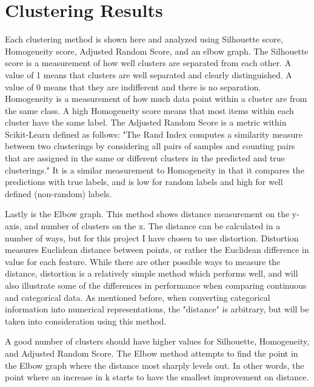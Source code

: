 \documentclass[
	letterpaper, %
]{mlreport}
\begin{document}
\section{Clustering Results}
Each clustering method is shown here and analyzed using Silhouette score, Homogeneity score, Adjusted Random Score, and an elbow graph. The Silhouette score is a measurement of how well clusters are separated from each other. A value of 1 means that clusters are well separated and clearly distinguished. A value of 0 means that they are indifferent and there is no separation. Homogeneity is a measurement of how much data point within a cluster are from the same class. A high Homogeneity score means that most items within each cluster have the same label. The Adjusted Random Score is a metric within Scikit-Learn defined as follows: "The Rand Index computes a similarity measure between two clusterings by considering all pairs of samples and counting pairs that are assigned in the same or different clusters in the predicted and true clusterings." It is a similar measurement to Homogeneity in that it compares the predictions with true labels, and is low for random labels and high for well defined (non-random) labels.

Lastly is the Elbow graph. This method shows distance measurement on the y-axis, and number of clusters on the x. The distance can be calculated in a number of ways, but for this project I have chosen to use distortion. Distortion measures Euclidean distance between points, or rather the Euclidean difference in value for each feature. While there are other possible ways to measure the distance, distortion is a relatively simple method which performs well, and will also illustrate some of the differences in performance when comparing continuous and categorical data. As mentioned before, when converting categorical information into numerical representations, the "distance" is arbitrary, but will be taken into consideration using this method.

A good number of clusters should have higher values for Silhouette, Homogeneity, and Adjusted Random Score. The Elbow method attempts to find the point in the Elbow graph where the distance most sharply levels out. In other words, the point where an increase in k starts to have the smallest improvement on distance.
\end{document}

